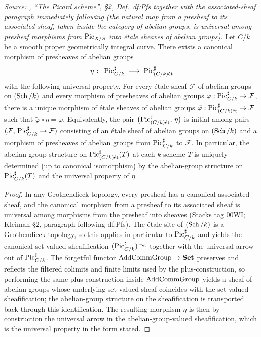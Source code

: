 \begin{theorem}
  \label{mk-thm:rel_pic_etale_sheaf_unit_canonical}

  \textit{Source: \cite{kleiman-picard}, ``The Picard scheme'', \S 2,
  Def.~df:Pfs together with the associated-sheaf paragraph
  immediately following (the natural map from a presheaf to its
  associated sheaf, taken inside the category of abelian groups, is
  universal among presheaf morphisms from \(\operatorname{Pic}_{X/S}\) into \'etale
  sheaves of abelian groups).}
  Let \(C/k\) be a smooth proper geometrically integral curve. There
  exists a canonical morphism of presheaves of abelian groups
  \[
    \eta \;\colon\; \operatorname{Pic}^\sharp_{C/k} \;\longrightarrow\;
    \operatorname{Pic}^\sharp_{(C/k)\mathrm{\acute{e}t}}
  \]
  with the following universal property. For every \'etale sheaf
  \(\mathcal{F}\) of abelian groups on \((\operatorname{Sch}/k)\) and every morphism
  of presheaves of abelian groups
  \(\varphi : \operatorname{Pic}^\sharp_{C/k} \to \mathcal{F}\), there is a unique
  morphism of \'etale sheaves of abelian groups
  \(\tilde\varphi : \operatorname{Pic}^\sharp_{(C/k)\mathrm{\acute{e}t}} \to \mathcal{F}\) such that
  \(\tilde\varphi \circ \eta = \varphi\). Equivalently, the pair
  \(\bigl(\operatorname{Pic}^\sharp_{(C/k)\mathrm{\acute{e}t}}, \, \eta\bigr)\) is initial among
  pairs \((\mathcal{F}, \, \operatorname{Pic}^\sharp_{C/k} \to \mathcal{F})\)
  consisting of an \'etale sheaf of abelian groups on \((\operatorname{Sch}/k)\) and
  a morphism of presheaves of abelian groups from \(\operatorname{Pic}^\sharp_{C/k}\)
  to \(\mathcal{F}\). In particular, the abelian-group structure on
  \(\operatorname{Pic}^\sharp_{(C/k)\mathrm{\acute{e}t}}(T)\) at each \(k\)-scheme \(T\) is uniquely
  determined (up to canonical isomorphism) by the abelian-group
  structure on \(\operatorname{Pic}^\sharp_{C/k}(T)\) and the universal property of
  \(\eta\).
\end{theorem}
\begin{proof}

  In any Grothendieck topology, every presheaf has a canonical
  associated sheaf, and the canonical morphism from a presheaf to its
  associated sheaf is universal among morphisms from the presheaf into
  sheaves (Stacks tag 00WI; Kleiman \S 2, paragraph following
  df:Pfs). The \'etale site of \((\operatorname{Sch}/k)\) is a Grothendieck
  topology, so this applies in particular to \(\operatorname{Pic}^\sharp_{C/k}\) and
  yields the canonical set-valued sheafification
  \((\operatorname{Pic}^\sharp_{C/k})^{\sim_{\mathrm{\acute{e}t}}}\) together with the universal arrow
  out of \(\operatorname{Pic}^\sharp_{C/k}\). The forgetful functor
  \(\mathrm{AddCommGroup} \to \mathbf{Set}\) preserves and reflects the
  filtered colimits and finite limits used by the plus-construction,
  so performing the same plus-construction inside \(\mathrm{AddCommGroup}\)
  yields a sheaf of abelian groups whose underlying set-valued sheaf
  coincides with the set-valued sheafification; the abelian-group
  structure on the sheafification is transported back through this
  identification. The resulting morphism \(\eta\) is then by
  construction the universal arrow in the abelian-group-valued
  sheafification, which is the universal property in the form stated.
\end{proof}

